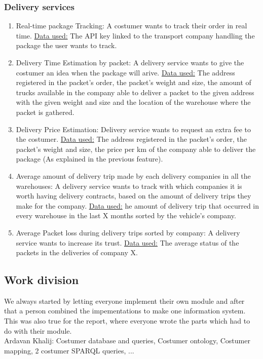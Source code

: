 \documentclass{article}
\begin{document}
\subsubsection{Delivery services}
\begin{enumerate}
  \item Real-time package Tracking: A costumer wants to track their order in real time. \underline{Data used:} The API key linked to the transport company handling the package the user wants to track.
  \item Delivery Time Estimation by packet: A delivery service wants to give the costumer an idea when the package will arive. \underline{Data used:} The address registered in the packet’s order, the packet’s weight and size, the amount of trucks available in the company able to deliver a packet to the given address with the given weight and size and the location of the warehouse where the packet is gathered.
  \item Delivery Price Estimation: Delivery service wants to request an extra fee to the costumer. \underline{Data used:} The address registered in the packet’s order, the packet’s weight and size, the price per km of the company able to deliver the package (As explained in the previous feature).
  \item Average amount of delivery trip made by each delivery companies in all the warehouses: A delivery service wants to track with which companies it is worth having delivery contracts, based on the amount of delivery trips they make for the company. \underline{Data used:} he amount of delivery trip that occurred in every warehouse in the last X months sorted by the vehicle’s company.
  \item Average Packet loss during delivery trips sorted by company: A delivery service wants to increase its trust. \underline{Data used:} The average status of the packets in the deliveries of company X.
\end{enumerate}


\subsection{Work division}
We always started by letting everyone implement their own module and after that a person combined the impementations to make one information system. This was also true for the report, where everyone wrote the parts which had to do with their module.  \\

\noindent Ardavan Khalij: Costumer database and queries, Costumer ontology, Costumer mapping, 2 costumer SPARQL queries, ...
\\
\end{document}
